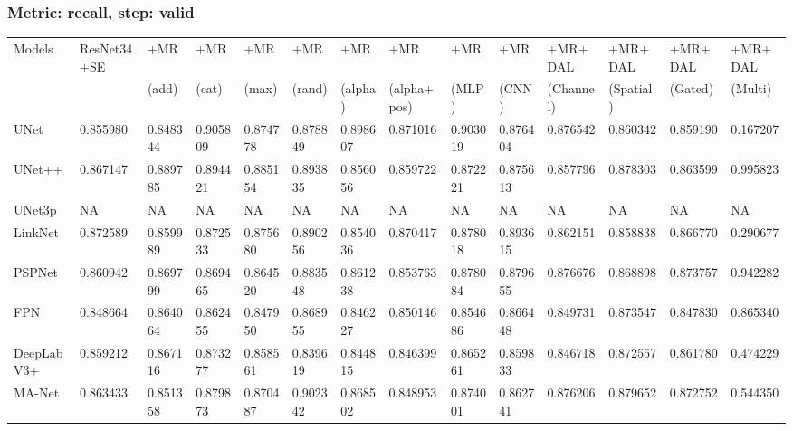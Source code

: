 \documentclass{article}
\begin{document}
\subsubsection{Metric: recall, step: valid}
\begin{tabular}{llllllllllllll}
\toprule
Models & ResNet34+SE & +MR  & +MR  & +MR  & +MR  & +MR  & +MR  & +MR  & +MR  & +MR+DAL & +MR+DAL & +MR+DAL & +MR+DAL \\
       &             &  (add) &  (cat) &  (max) &  (rand) &  (alpha) &  (alpha+pos) &  (MLP) &  (CNN) & (Channel) & (Spatial) & (Gated) & (Multi) \\
\midrule
UNet & 0.855980 & 0.848344 & 0.905809 & 0.874778 & 0.878849 & 0.898607 & 0.871016 & 0.903019 & 0.876404 & 0.876542 & 0.860342 & 0.859190 & 0.167207 \\
UNet++ & 0.867147 & 0.889785 & 0.894421 & 0.885154 & 0.893835 & 0.856056 & 0.859722 & 0.872221 & 0.875613 & 0.857796 & 0.878303 & 0.863599 & 0.995823 \\
UNet3p & NA & NA & NA & NA & NA & NA & NA & NA & NA & NA & NA & NA & NA \\
LinkNet & 0.872589 & 0.859989 & 0.872533 & 0.875680 & 0.890256 & 0.854036 & 0.870417 & 0.878018 & 0.893615 & 0.862151 & 0.858838 & 0.866770 & 0.290677 \\
PSPNet & 0.860942 & 0.869799 & 0.869465 & 0.864520 & 0.883548 & 0.861238 & 0.853763 & 0.878084 & 0.879655 & 0.876676 & 0.868898 & 0.873757 & 0.942282 \\
FPN & 0.848664 & 0.864064 & 0.862455 & 0.847950 & 0.868955 & 0.846227 & 0.850146 & 0.854686 & 0.866448 & 0.849731 & 0.873547 & 0.847830 & 0.865340 \\
DeepLabV3+ & 0.859212 & 0.867116 & 0.873277 & 0.858561 & 0.839619 & 0.844815 & 0.846399 & 0.865261 & 0.859833 & 0.846718 & 0.872557 & 0.861780 & 0.474229 \\
MA-Net & 0.863433 & 0.851358 & 0.879873 & 0.870487 & 0.902342 & 0.868502 & 0.848953 & 0.874001 & 0.862741 & 0.876206 & 0.879652 & 0.872752 & 0.544350 \\
\bottomrule
\end{tabular}
\end{document}
